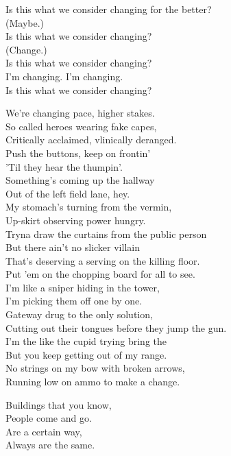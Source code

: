 Is this what we consider changing for the better? \\
(Maybe.) \\
Is this what we consider changing? \\
(Change.) \\
Is this what we consider changing? \\
I'm changing. I'm changing. \\
Is this what we consider changing? \\


We're changing pace, higher stakes. \\
So called heroes wearing fake capes, \\
Critically acclaimed, vlinically deranged. \\
Push the buttons, keep on frontin' \\
'Til they hear the thumpin'. \\
Something's coming up the hallway \\
Out of the left field lane, hey. \\

My stomach's turning from the vermin, \\
Up-skirt observing power hungry. \\
Tryna draw the curtains from the public person \\
But there ain't no slicker villain \\
That's deserving a serving on the killing floor. \\
Put 'em on the chopping board for all to see. \\

I'm like a sniper hiding in the tower, \\
I'm picking them off one by one. \\
Gateway drug to the only solution, \\
Cutting out their tongues before they jump the gun. \\

I'm the like the cupid trying bring the  \\
But you keep getting out of my range. \\
No strings on my bow with broken arrows, \\
Running low on ammo to make a change. \\


Buildings that you know, \\
People come and go. \\
Are a certain way, \\
Always are the same. \\

